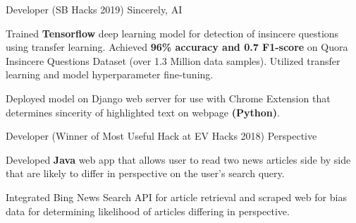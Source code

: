 

\begin{cventries}

  \cventry
    {Developer (SB Hacks 2019)} %
    {Sincerely, AI} %
    {} %
    {} %
    {
      \begin{cvitems} %
        \item {Trained \textbf{Tensorflow} deep learning model for detection of insincere questions using 
        transfer learning. Achieved \textbf{96\% accuracy and 0.7 F1-score} on Quora Insincere 
        Questions Dataset (over 1.3 Million data samples). Utilized transfer learning and model hyperparameter fine-tuning.}
        \item {Deployed model on Django web server for use with Chrome Extension that determines
        sincerity of highlighted text on webpage \textbf{(Python)}.}
      \end{cvitems}
    }

  \cventry
    {Developer (Winner of Most Useful Hack at EV Hacks 2018)} %
    {Perspective} %
    {} %
    {} %
    {
      \begin{cvitems} %
        \item {Developed \textbf{Java} web app that allows user to read two news articles side by side 
        that are likely to differ in perspective on the user's search query. }
        \item{Integrated Bing News Search API for article retrieval and scraped web for bias data for determining likelihood of articles differing in perspective.}
      \end{cvitems}
    }

\end{cventries}
